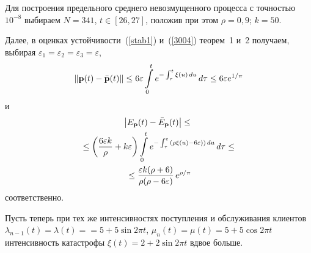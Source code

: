 \begin{multicols}{2}
\medskip
Для построения предельного среднего невозмущенного процесса с точностью~$10^{-8}$ 
выбираем $N=341$, $t\in [26,27]$, положив при этом
$\rho = 0{,}9$; $k = 50$.

\medskip
Далее, в оценках устойчивости~(\ref{stab1}) и~(\ref{3004}) теорем~1 и~2 получаем, 
выбирая $\varepsilon_1 =\varepsilon_2 =\varepsilon_3=\varepsilon$,
\begin{equation*}
\left\|{\mathbf p}(t)-\bar{{\mathbf p}}(t)\right\|\le
6\varepsilon \int\limits_0^t {e^{-\int_{\tau}^t \xi (u)\, du}\, d\tau}  \le 6\varepsilon e^{1/\pi}
\end{equation*}
и
\begin{multline*}
\left|E_{\mathbf p}(t)- \bar{E}_{\mathbf p}(t)\right| \le{}\\
{}\le\left( \displaystyle\frac{\displaystyle 6\varepsilon k\mathstrut}{\displaystyle \rho\mathstrut}+k\varepsilon \right)
\int\limits_0^t {e^{-\int_{\tau}^t {(\rho \xi(u)-6\varepsilon)})\, du}\, d\tau} \le {}\\
{}\le
\displaystyle\frac{\displaystyle \varepsilon k (\rho +6)\mathstrut}{\displaystyle \rho(\rho -6\varepsilon)\mathstrut}\, e^{\rho/\pi}
\end{multline*}
соответственно.


\bigskip

Пусть  теперь при тех же интенсивностях поступления и обслуживания клиентов  
$\lambda_{n-1}(t) = \lambda(t) =$\linebreak $= 5+5\sin 2\pi t $, $\mu_n(t) = \mu(t)=5 + 5\cos 2\pi t $ 
интенсивность катастрофы  $\xi(t)=2 + 2\sin 2 \pi t$ вдвое больше.

\begin{figure*} %
\vspace*{1pt}
\begin{minipage}[t]{80mm}
\begin{center}
\mbox{%
\epsfxsize=78.755mm %
}
\end{center}
\vspace*{-12pt}
\end{minipage}
\hfill
\vspace*{1pt}
\begin{minipage}[t]{80mm}
\begin{center}
\mbox{%
\epsfxsize=78.755mm %
}
\end{center}
\vspace*{-12pt}
\end{minipage}
\end{figure*}


\end{multicols}
